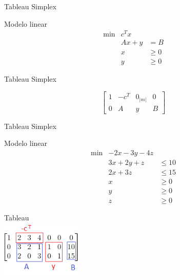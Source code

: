 \documentclass[compress,mathserif]{beamer}
\begin{document}
\begin{frame}{Tableau Simplex}

Modelo linear
$$\begin{matrix}
        \min & c^Tx \\ 
             & Ax + y & = B \\
             & x & \geqslant 0 \\
             & y & \geqslant 0
        \end{matrix}    
$$

\vspace{1cm}

Tableau Simplex

$$\begin{bmatrix}
1 & -c^T & 0_{|m|} & 0\\ 
0 & A & y & B 
\end{bmatrix}$$

\end{frame}


\begin{frame}{Tableau Simplex}

Modelo linear
$$\begin{matrix}
        \min & -2x - 3y - 4z \\ 
             & 3x + 2y + z & \leq 10 \\
             & 2x + 3z & \leq 15 \\
             & x & \geqslant 0 \\
             & y & \geqslant 0 \\
             & z & \geqslant 0 
        \end{matrix}    
$$

\vspace{1cm}
Tableau \\ 
\centering \includegraphics[width=0.3\textwidth]{images/tableau.png}

\end{frame}
\end{document}
